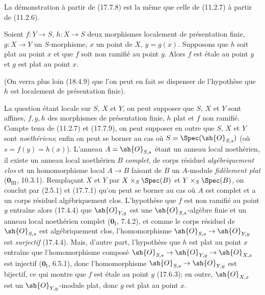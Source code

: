 La démonstration à partir de (17.7.8) est la même que celle de (11.2.7) à partir de (11.2.6).

\begin{proposition}[17.7.10]
\label{IV.17.7.10}
Soient $f:Y\to S$, $h:X\to S$ deux morphismes localement de présentation finie, $g:X\to Y$ un $S$-morphisme, $x$ un point de $X$, $y=g(x)$. Supposons que $h$ soit \textup{plat} au point $x$ et que $f$ soit \textup{non ramifié} au point $y$. Alors $f$ est \textup{étale} au point $y$ et $g$ est \textup{plat} au point $x$.
\end{proposition}

(On verra plus loin (18.4.9) que l'on peut en fait se dispenser de l'hypothèse que $h$ est localement de présentation finie).

La question étant locale sur $S$, $X$ et $Y$, on peut supposer que $S$, $X$ et $Y$ sont affines, $f,g,h$ des morphismes de présentation finie, $h$ plat et $f$ non ramifié. Compte tenu de (11.2.7) et (17.7.9), on peut supposer en outre que $S$, $X$ et $Y$ sont \emph{noethériens}; enfin on peut se borner au cas où $S=\Spec(\sh{O}_{S,s})$ (où $s=f(y)=h(x)$). L'anneau $A=\sh{O}_{S,s}$ étant un anneau local noethérien, il existe un anneau local noethérien $B$ \emph{complet}, de corps résiduel \emph{algébriquement clos} et un homomorphisme local $A\to B$ faisant de $B$ un $A$-module \emph{fidèlement plat} ($\mathbf{0}_{\mathrm{III}}$, 10.3.1). Remplaçant $X$ et $Y$ par $X\times_S\Spec(B)$ et $Y\times_S\Spec(B)$, on conclut par (2.5.1) et (17.7.1) qu'on peut se borner au cas où $A$ est complet et a un corps résiduel algébriquement clos. L'hypothèse que $f$ est non ramifié au point $y$ entraîne alors (17.4.4) que $\sh{O}_{Y,y}$ est une $\sh{O}_{S,s}$-algèbre finie et un anneau local noethérien complet ($\mathbf{0}_{\mathrm I}$, 7.4.2), et comme le corps résiduel de $\sh{O}_{S,s}$ est algébriquement clos, l'homomorphisme $\sh{O}_{S,s}\to\sh{O}_{Y,y}$ est \emph{surjectif} (17.4.4). Mais, d'autre part, l'hypothèse que $h$ est plat au point $x$ entraîne que l'homomorphisme composé $\sh{O}_{S,s}\to\sh{O}_{Y,y}\to\sh{O}_{X,x}$ est injectif ($\mathbf{0}_{\mathrm I}$, 6.5.1), donc l'homomorphisme $\sh{O}_{S,s}\to\sh{O}_{Y,y}$ est bijectif, ce qui montre que $f$ est étale au point $y$ (17.6.3); en outre, $\sh{O}_{X,x}$ est un $\sh{O}_{Y,y}$-module plat, donc $g$ est plat au point $x$.

